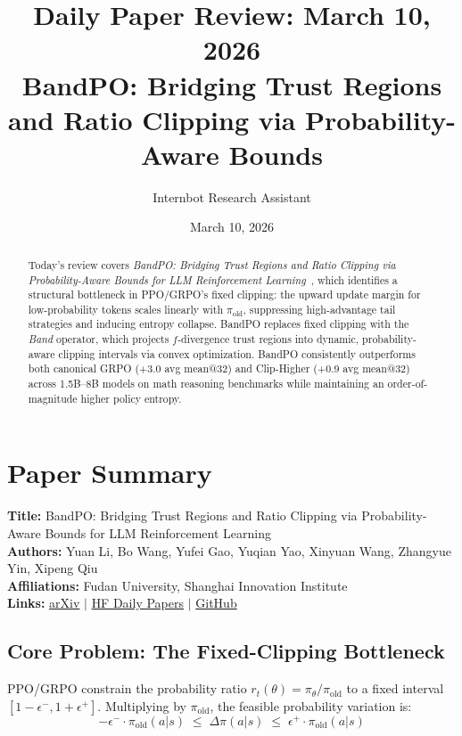 \documentclass[11pt]{article}
\title{Daily Paper Review: March 10, 2026\\BandPO: Bridging Trust Regions and Ratio Clipping via Probability-Aware Bounds}
\author{Internbot Research Assistant}
\date{March 10, 2026}
\begin{document}
\maketitle

\begin{abstract}
Today's review covers \emph{BandPO: Bridging Trust Regions and Ratio Clipping via Probability-Aware Bounds for LLM Reinforcement Learning}~\citep{li2026bandpo}, which identifies a structural bottleneck in PPO/GRPO's fixed clipping: the upward update margin for low-probability tokens scales linearly with $\pi_{\text{old}}$, suppressing high-advantage tail strategies and inducing entropy collapse. BandPO replaces fixed clipping with the \emph{Band} operator, which projects $f$-divergence trust regions into dynamic, probability-aware clipping intervals via convex optimization. BandPO consistently outperforms both canonical GRPO (+3.0 avg mean@32) and Clip-Higher (+0.9 avg mean@32) across 1.5B--8B models on math reasoning benchmarks while maintaining an order-of-magnitude higher policy entropy.
\end{abstract}

\section{Paper Summary}

\textbf{Title:} BandPO: Bridging Trust Regions and Ratio Clipping via Probability-Aware Bounds for LLM Reinforcement Learning\\
\textbf{Authors:} Yuan Li, Bo Wang, Yufei Gao, Yuqian Yao, Xinyuan Wang, Zhangyue Yin, Xipeng Qiu\\
\textbf{Affiliations:} Fudan University, Shanghai Innovation Institute\\
\textbf{Links:}
\href{https://arxiv.org/abs/2603.04918}{arXiv} $\mid$
\href{https://huggingface.co/papers/2603.04918}{HF Daily Papers} $\mid$
\href{https://github.com/OpenMOSS/BandPO}{GitHub}

\subsection{Core Problem: The Fixed-Clipping Bottleneck}

PPO/GRPO constrain the probability ratio $r_t(\theta) = \pi_\theta/\pi_{\text{old}}$ to a fixed interval $[1{-}\epsilon^-, 1{+}\epsilon^+]$. Multiplying by $\pi_{\text{old}}$, the feasible probability variation is:
\begin{equation}
    -\epsilon^- \cdot \pi_{\text{old}}(a|s) \;\leq\; \Delta\pi(a|s) \;\leq\; \epsilon^+ \cdot \pi_{\text{old}}(a|s)
\end{equation}
\end{document}

